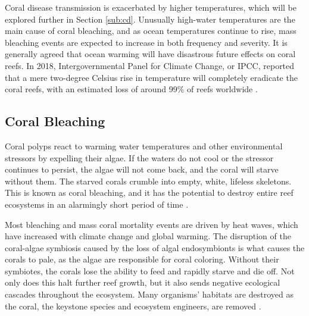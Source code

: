 \documentclass{book}\usepackage{knitr}
\begin{document}
\begin{knitrout}
\begin{kframe}
Coral disease transmission is exacerbated by higher temperatures, which will be explored further in Section \ref{sub:cd}. Unusually high-water temperatures are the main cause of coral bleaching, and as ocean temperatures continue to rise, mass bleaching events are expected to increase in both frequency and severity\citep{Keller2009ClimateCC}. It is generally agreed that ocean warming will have disastrous future effects on coral reefs.  In 2018, Intergovernmental Panel for Climate Change, or IPCC, reported that a mere two-degree Celsius rise in temperature will completely eradicate the coral reefs, with an estimated loss of around 99\% of reefs worldwide \citep{wwfindex}. 

\subsection{Coral Bleaching}

Coral polyps react to warming water temperatures and other environmental stressors by expelling their algae. If the waters do not cool or the stressor continues to persist, the algae will not come back, and the coral will starve without them. The starved corals crumble into empty, white, lifeless skeletons. This is known as coral bleaching, and it has the potential to destroy entire reef ecosystems in an alarmingly short period of time \citep{https://doi.org/10.1111/gcb.14871}. 

Most bleaching and mass coral mortality events are driven by heat waves, which have increased with climate change and global warming. The disruption of the coral-algae symbiosis caused by the loss of algal endosymbionts is what causes the corals to pale, as the algae are responsible for coral coloring. Without their symbiotes, the corals lose the ability to feed and rapidly starve and die off. Not only does this halt further reef growth, but it also sends negative ecological cascades throughout the ecosystem. Many organisms' habitats are destroyed as the coral, the keystone species and ecosystem engineers, are removed \citep{https://doi.org/10.1111/gcb.14871}.


\end{kframe}
\end{knitrout}
\end{document}
